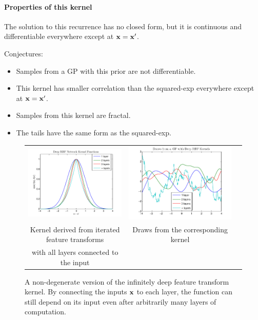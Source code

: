 \documentclass{article}
\begin{document}
\paragraph{Properties of this kernel} The solution to this recurrence has no closed form, but it is continuous and differentiable everywhere except at ${\bf{x}} = {\bf{x}}'$.

Conjectures:  
\begin{itemize}
\item Samples from a GP with this prior are not differentiable.
\item This kernel has smaller correlation than the squared-exp everywhere except at ${\bf{x}} = {\bf{x}}'$.  
\item Samples from this kernel are fractal.
\item The tails have the same form as the squared-exp.
\end{itemize}


\begin{figure}
\centering
\begin{tabular}{ccc}
\includegraphics[width=0.5\columnwidth, clip, trim = 0cm 0cm 0cm 0.61cm]{figures/deep_kernel_connected} &
\includegraphics[width=0.5\columnwidth, clip, trim = 0cm 0cm 0cm 0.61cm]{figures/deep_kernel_connected_draws} \\
Kernel derived from iterated feature transforms & Draws from the corresponding kernel \\
with all layers connected to the input &
\end{tabular}
\caption{A non-degenerate version of the infinitely deep feature transform kernel.  By connecting the inputs ${\bf{x}}$ to each layer, the function can still depend on its input even after arbitrarily many layers of computation.}
\label{fig:deep_kernel_connected}
\end{figure}
\end{document}
